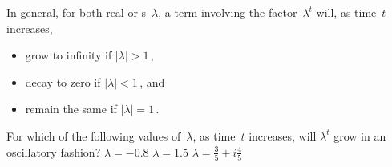 In general, for both real or s~\(\lambda\), a term involving the factor~\(\lambda^t\) will, as time~\(t\) increases,
\begin{itemize}
\item grow to infinity if \(|\lambda|>1\)\,,
\item decay to zero if \(|\lambda|<1\)\,, and
\item remain the same  if \(|\lambda|=1\)\,.
\end{itemize}




\begin{activity}
For which of the following values of~\(\lambda\), as time~\(t\) increases, will \(\lambda^t\) grow in an oscillatory fashion?
{\(\lambda=-0.8\)}
{\(\lambda=1.5\)}
{\(\lambda=\frac35+i\frac45\)}
\end{activity}




